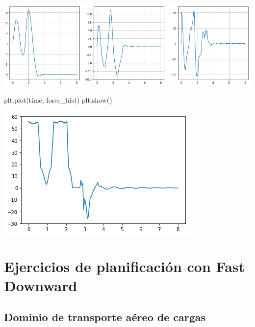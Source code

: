 \documentclass[onecolumn]{article}
\newenvironment{Shaded}{}{}
\newcommand{\NormalTok}[1]{#1}
\begin{document}
\includegraphics{output_41_0.png}

\begin{Shaded}
\begin{Highlighting}[]
\NormalTok{plt.plot(time, force_hist)}
\NormalTok{plt.show()}
\end{Highlighting}
\end{Shaded}

\includegraphics{output_42_0.png}

\begin{Shaded}
\begin{Highlighting}[]

\end{Highlighting}
\end{Shaded}

\hypertarget{ejercicios-de-planificaciuxf3n-con-fast-downward}{%
\section{Ejercicios de planificación con Fast
Downward}\label{ejercicios-de-planificaciuxf3n-con-fast-downward}}

\hypertarget{dominio-de-transporte-auxe9reo-de-cargas}{%
\subsection{Dominio de transporte aéreo de
cargas}\label{dominio-de-transporte-auxe9reo-de-cargas}}
\end{document}
